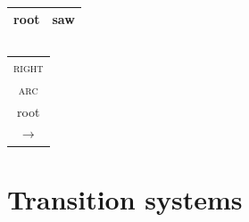 \documentclass[t]{beamer}
\begin{document}
\begin{frame}
{\begin{varwidth}{1.8\linewidth}
{\begin{dependency}
	\end{dependency}
	\\
	\begin{tabular}{|l|l|}\hline
	\color{red} root & \color{red} saw \\ \hline
	\end{tabular}
	\hspace{16mm}
	\begin{tabular}{|l|}\hline
	\quad \\ \hline
	\end{tabular}
	}
	\begin{tabular}{c}\textsc{right}\\ \textsc{arc}\\{\footnotesize root}\\$\rightarrow$\end{tabular}
	
    \vspace{5mm}
	
    \end{varwidth}
	}
\end{frame}

\section{Transition systems}
\end{document}
